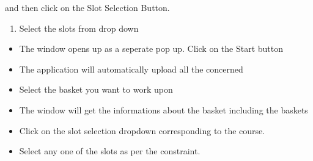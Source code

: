 \documentclass[letterpaper,10pt,english]{sphinxmanual}
\begin{document}
and then click on the Slot Selection Button.
\begin{enumerate}
%
\setcounter{enumi}{1}
\item {} 
Select the slots from drop down

\end{enumerate}
\begin{itemize}
\item {} 
The window opens up as a seperate pop up. Click on the Start button

\end{itemize}

\begin{itemize}
\item {} 
The application will automatically upload all the concerned

\end{itemize}

\begin{itemize}
\item {} 
Select the basket you want to work upon

\end{itemize}

\begin{itemize}
\item {} 
The window will get the informations about the basket including the baskets

\end{itemize}

\begin{itemize}
\item {} 
Click on the slot selection dropdown corresponding to the course.

\end{itemize}

\begin{itemize}
\item {} 
Select any one of the slots as per the constraint.

\end{itemize}
\end{document}

